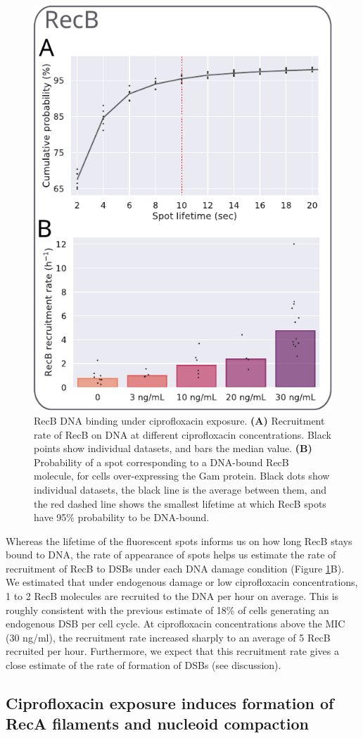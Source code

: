 \begin{figure}[htbp]
    \centering
    \includegraphics[width=.4\textwidth]{Figures/Fig2_RecB_recruitment.pdf}
    \caption{RecB DNA binding under ciprofloxacin exposure. \textbf{(A)} Recruitment rate of RecB on DNA at different ciprofloxacin concentrations. Black points show individual datasets, and bars the median value. \textbf{(B)}  Probability of a spot corresponding to a DNA-bound RecB molecule, for cells over-expressing the Gam protein. Black dots show individual datasets, the black line is the average between them, and the red dashed line shows the smallest lifetime at which RecB spots have 95\% probability to be DNA-bound.}
    \label{Fig:recruitment}
\end{figure}

Whereas the lifetime of the fluorescent spots informs us on how long RecB stays bound to DNA, the rate of appearance of spots helps us estimate the rate of recruitment of RecB to DSBs under each DNA damage condition (Figure \ref{Fig:recruitment}B). We estimated that under endogenous damage or low ciprofloxacin concentrations, 1 to 2 RecB molecules are recruited to the DNA per hour on average. This is roughly consistent with the previous estimate of 18\% of cells generating an endogenous DSB per cell cycle\cite{Sinha2018}. At ciprofloxacin concentrations above the MIC (30 ng/ml), the recruitment rate increased sharply to an average of 5 RecB recruited per hour. Furthermore, we expect that this recruitment rate gives a close estimate of the rate of formation of DSBs (see discussion).

\subsection*{Ciprofloxacin exposure induces formation of RecA filaments and nucleoid compaction}

